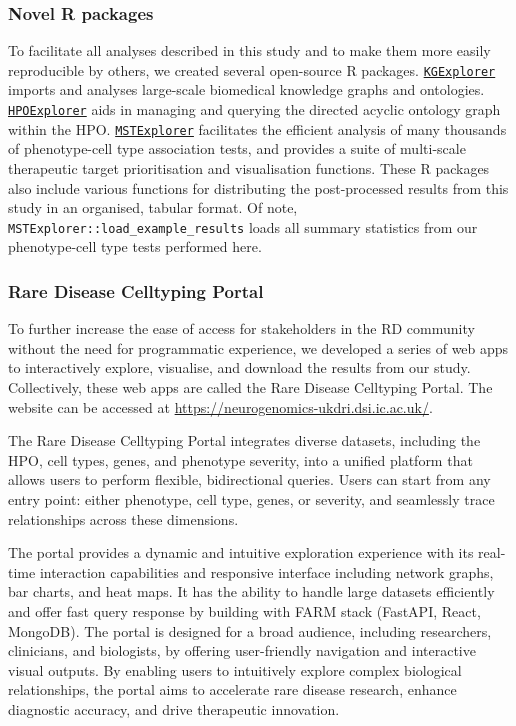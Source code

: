 \documentclass[
]{article}
\begin{document}
\subsubsection{Novel R packages}\label{novel-r-packages}

To facilitate all analyses described in this study and to make them more
easily reproducible by others, we created several open-source R
packages.
\href{https://github.com/neurogenomics/KGExplorer}{\texttt{KGExplorer}}
imports and analyses large-scale biomedical knowledge graphs and
ontologies.
\href{https://github.com/neurogenomics/HPOExplorer}{\texttt{HPOExplorer}}
aids in managing and querying the directed acyclic ontology graph within
the HPO.
\href{https://github.com/neurogenomics/MSTExplorer}{\texttt{MSTExplorer}}
facilitates the efficient analysis of many thousands of phenotype-cell
type association tests, and provides a suite of multi-scale therapeutic
target prioritisation and visualisation functions. These R packages also
include various functions for distributing the post-processed results
from this study in an organised, tabular format. Of note,
\texttt{MSTExplorer::load\_example\_results} loads all summary
statistics from our phenotype-cell type tests performed here.

\subsubsection{Rare Disease Celltyping
Portal}\label{rare-disease-celltyping-portal}

To further increase the ease of access for stakeholders in the RD
community without the need for programmatic experience, we developed a
series of web apps to interactively explore, visualise, and download the
results from our study. Collectively, these web apps are called the Rare
Disease Celltyping Portal. The website can be accessed at
\url{https://neurogenomics-ukdri.dsi.ic.ac.uk/}.

The Rare Disease Celltyping Portal integrates diverse datasets,
including the HPO, cell types, genes, and phenotype severity, into a
unified platform that allows users to perform flexible, bidirectional
queries. Users can start from any entry point: either phenotype, cell
type, genes, or severity, and seamlessly trace relationships across
these dimensions.

The portal provides a dynamic and intuitive exploration experience with
its real-time interaction capabilities and responsive interface
including network graphs, bar charts, and heat maps. It has the ability
to handle large datasets efficiently and offer fast query response by
building with FARM stack (FastAPI, React, MongoDB). The portal is
designed for a broad audience, including researchers, clinicians, and
biologists, by offering user-friendly navigation and interactive visual
outputs. By enabling users to intuitively explore complex biological
relationships, the portal aims to accelerate rare disease research,
enhance diagnostic accuracy, and drive therapeutic innovation.
\end{document}
